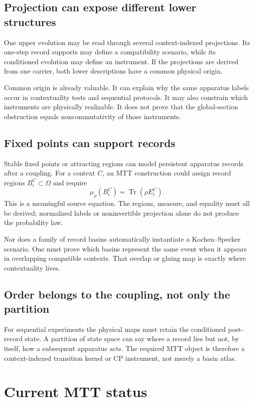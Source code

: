 \documentclass[11pt]{article}
\newcommand{\Tr}{\operatorname{Tr}}
\begin{document}
\subsection{Projection can expose different lower structures}

One upper evolution may be read through several context-indexed projections.
Its one-step record supports may define a compatibility scenario, while its
conditioned evolution may define an instrument. If the projections are
derived from one carrier, both lower descriptions have a common physical
origin.

Common origin is already valuable. It can explain why the same apparatus
labels occur in contextuality tests and sequential protocols. It may also
constrain which instruments are physically realizable. It does not prove that
the global-section obstruction equals noncommutativity of those instruments.

\subsection{Fixed points can support records}

Stable fixed points or attracting regions can model persistent apparatus
records after a coupling. For a context \(C\), an MTT construction could assign
record regions \(B_i^C\subset\Omega\) and require
\[
\mu_\rho(B_i^C)=\Tr(\rho E_i^C).
\]
This is a meaningful source equation. The regions, measure, and equality must
all be derived; normalized labels or noninvertible projection alone do not
produce the probability law.

Nor does a family of record basins automatically instantiate a
Kochen--Specker scenario. One must prove which basins represent the same event
when it appears in overlapping compatible contexts. That overlap or gluing
map is exactly where contextuality lives.

\subsection{Order belongs to the coupling, not only the partition}

For sequential experiments the physical maps must retain the conditioned
post-record state. A partition of state space can say where a record lies but
not, by itself, how a subsequent apparatus acts. The required MTT object is
therefore a context-indexed transition kernel or CP instrument, not merely a
basin atlas.

\section{Current MTT status}
\end{document}
